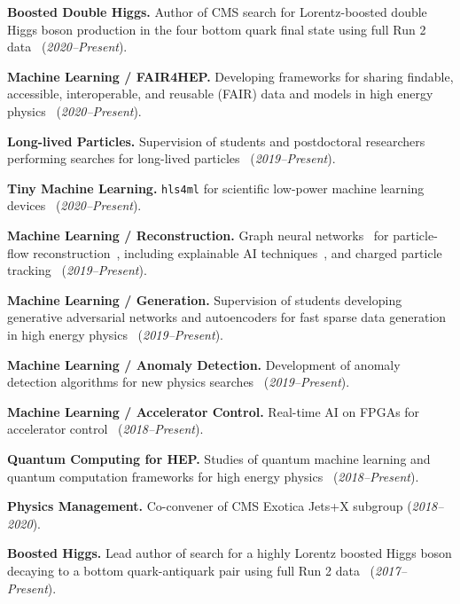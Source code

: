 \documentclass{res}
\begin{document}
\begin{resume}
  \textbf{Boosted Double Higgs.} Author of CMS search for Lorentz-boosted double Higgs boson production in the four bottom quark final state using full Run 2 data~\cite{CMS:2022nmn} (\textit{2020--Present}).

  \textbf{Machine Learning / FAIR4HEP.} Developing frameworks for sharing findable, accessible, interoperable, and reusable (FAIR) data and models in high energy physics~\cite{Chen:2021euv} (\textit{2020--Present}).

  \textbf{Long-lived Particles.} Supervision of students and postdoctoral researchers performing searches for long-lived particles~\cite{CMS:2021yhb,CMS:2021juv} (\textit{2019--Present}).

  \textbf{Tiny Machine Learning.} \texttt{hls4ml} for scientific low-power machine learning devices~\cite{Banbury:2021mlperf,DiGuglielmo:2021ide,Hawks:2021ruw,Fahim:2021cic} (\textit{2020--Present}).

  \textbf{Machine Learning / Reconstruction.} Graph neural networks~\cite{Duarte:2020ngm} for particle-flow reconstruction~\cite{Pata:2022wam,CMS-DP-2021-030,Pata:2021oez}, including explainable AI techniques~\cite{Mokhtar:2021bkf}, and charged particle tracking~\cite{Elabd:2021lgo,Dezoort:2021kfk,Heintz:2020soy} (\textit{2019--Present}).

  \textbf{Machine Learning / Generation.} Supervision of students developing generative adversarial networks and autoencoders for fast sparse data generation in high energy physics~\cite{Touranakou:2022qrp,Kansal:2021cqp,Orzari:2021suh,Kansal:2020svm} (\textit{2019--Present}).

  \textbf{Machine Learning / Anomaly Detection.} Development of anomaly detection algorithms for new physics searches~\cite{Aarrestad:2021oeb,Jawahar:2021vyu,Tsan:2021brw,Govorkova:2021utb,Kasieczka:2021xcg,Wozniak:2020} (\textit{2019--Present}).

  \textbf{Machine Learning / Accelerator Control.} Real-time AI on FPGAs for accelerator control~\cite{John:2020sak} (\textit{2018--Present}).

  \textbf{Quantum Computing for HEP.} Studies of quantum machine learning and quantum computation frameworks for high energy physics~\cite{Zlokapa:2019tkn} (\textit{2018--Present}).

  \textbf{Physics Management.} Co-convener of CMS Exotica Jets+X subgroup (\textit{2018--2020}).

  \textbf{Boosted Higgs.} Lead author of search for a highly Lorentz boosted Higgs boson decaying to a bottom quark-antiquark pair using full Run 2 data~\cite{Sirunyan:2020hwz} (\textit{2017--Present}).


\end{resume}
\end{document}
